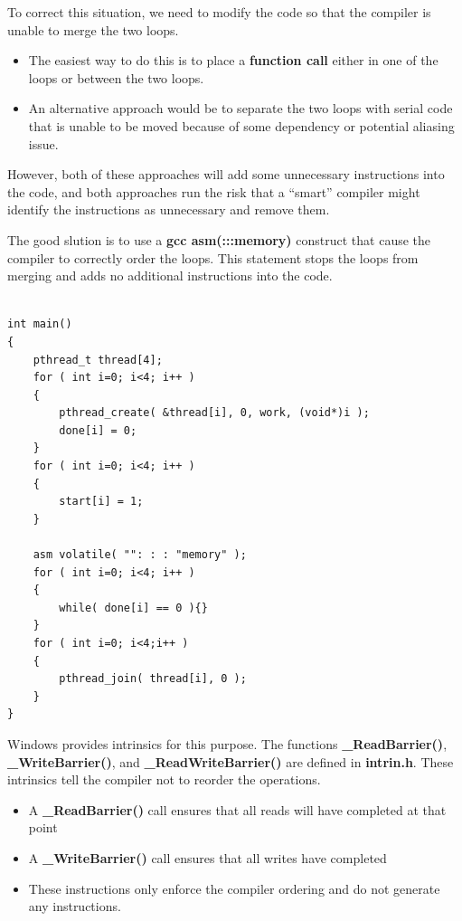 \documentclass[12pt,a4paper]{report}
\begin{document}
To correct this situation, we need to modify the code so that the compiler is unable to merge the two loops.
\begin{itemize}
	\item The easiest way to do this is to place a\textbf{ function call} either in one of the loops or between the two loops.
	\item An alternative approach would be to separate the two loops with serial code that is unable to be moved because of some dependency or potential aliasing issue.
\end{itemize}
However, both of these approaches will add some unnecessary instructions into the code, and both approaches run the risk that a ``smart'' compiler might identify the instructions as unnecessary and remove them.
\par
The good slution is to use a \textbf{gcc asm(:::memory)} construct that cause the compiler to correctly order the loops. This statement stops the loops from merging and adds no additional instructions into the code.
\begin{lstlisting}

int main()
{
	pthread_t thread[4];
	for ( int i=0; i<4; i++ )
	{
		pthread_create( &thread[i], 0, work, (void*)i );
		done[i] = 0;
	}
	for ( int i=0; i<4; i++ )
	{
		start[i] = 1;
	}

	asm volatile( "": : : "memory" );
	for ( int i=0; i<4; i++ )
	{
		while( done[i] == 0 ){}
	}
	for ( int i=0; i<4;i++ )
	{
		pthread_join( thread[i], 0 );
	}
}

\end{lstlisting}
Windows provides intrinsics for this purpose. The functions \textbf{\_ReadBarrier()}, \textbf{\_WriteBarrier()}, and \textbf{\_ReadWriteBarrier()} are defined in \textbf{intrin.h}. These intrinsics tell the compiler not to reorder the operations.
\begin{itemize}
	\item A \textbf{\_ReadBarrier()} call ensures that all reads will have completed at that point
	\item A \textbf{\_WriteBarrier()} call ensures that all writes have completed
	\item These instructions only enforce the compiler ordering and do not generate any instructions.
\end{itemize}
\end{document}
